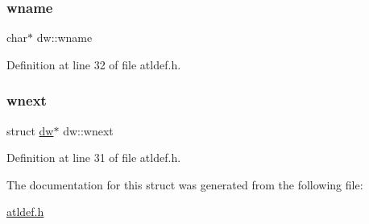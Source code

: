 \subsubsection{\texorpdfstring{wname}{wname}}
{\footnotesize\ttfamily char$\ast$ dw\+::wname}



Definition at line 32 of file atldef.\+h.

\mbox{\label{structdw_a6fd18eca22adae516d1ef8a9cda62731}} 
\subsubsection{\texorpdfstring{wnext}{wnext}}
{\footnotesize\ttfamily struct \hyperlink{structdw}{dw}$\ast$ dw\+::wnext}



Definition at line 31 of file atldef.\+h.



The documentation for this struct was generated from the following file\+:\begin{DoxyCompactItemize}
\item 
\hyperlink{atldef_8h}{atldef.\+h}\end{DoxyCompactItemize}
